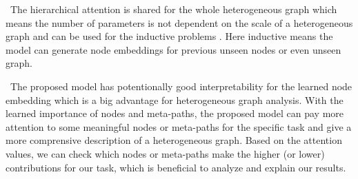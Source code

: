 \textbullet\
	The hierarchical attention is shared for the whole heterogeneous graph 
	which means the number of parameters is not 
	dependent on the scale of a heterogeneous graph and can be used for the inductive problems \cite{graphsage}. 
	Here inductive means the model  can generate node embeddings for previous unseen nodes or even unseen graph. 
	
\textbullet\
	The proposed model has potentionally good interpretability for the learned node embedding which is a big advantage for heterogeneous graph analysis.
With the learned importance of nodes and meta-paths, 
	the proposed model can pay more attention to some meaningful nodes or meta-paths for the specific task and give a more comprensive description of a heterogeneous graph. Based on the attention values, we can check which nodes or meta-paths make the higher (or lower) contributions for our task, which is beneficial to analyze and explain our results.


	




	











